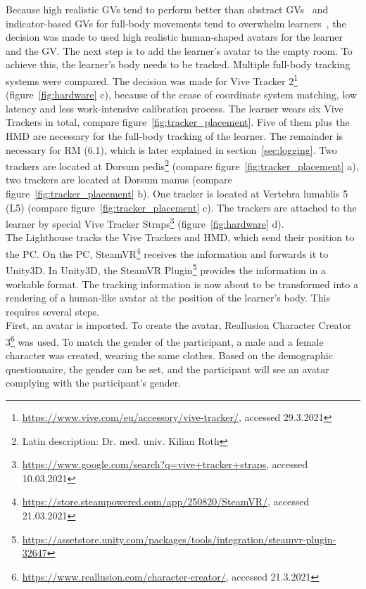 Because high realistic GVs tend to perform better than abstract GVs~\cite{weber} and indicator-based GVs for full-body movements tend to overwhelm learners~\cite{lightguide}, the decision was made to used high realistic human-shaped avatars for the learner and the GV. The next step is to add the learner's avatar to the empty room. To achieve this, the learner's body needs to be tracked. Multiple full-body tracking systems were compared. The decision was made for Vive Tracker 2\footnote{\href{https://www.vive.com/eu/accessory/vive-tracker/}{https://www.vive.com/eu/accessory/vive-tracker/}, accessed 29.3.2021} (figure~\ref{fig:hardware} c), because of the cease of coordinate system matching, low latency and less work-intensive calibration process. The learner wears six Vive Trackers in total, compare figure~\ref{fig:tracker_placement}. Five of them plus the HMD are necessary for the full-body tracking of the learner. The remainder is necessary for RM (6.1), which is later explained in section~\ref{sec:logging}. Two trackers are located at Dorsum pedis\footnote{\label{fn:latin}Latin description: Dr. med. univ. Kilian Roth} (compare figure~\ref{fig:tracker_placement} a), two trackers are located at Dorsum manus (compare figure~\ref{fig:tracker_placement} b). One  tracker is located at Vertebra lumablis 5 (L5) (compare figure~\ref{fig:tracker_placement} c). The trackers are attached to the learner by special Vive Tracker Straps\footnote{\href{https://www.google.com/search?q=vive+tracker+straps}{https://www.google.com/search?q=vive+tracker+straps}, accessed 10.03.2021} (figure~\ref{fig:hardware} d).\\
The Lighthouse tracks the Vive Trackers and HMD, which send their position to the PC. On the PC, SteamVR\footnote{\href{https://store.steampowered.com/app/250820/SteamVR/}{https://store.steampowered.com/app/250820/SteamVR/}, accessed 21.03.2021} receives the information and forwards it to Unity3D. In Unity3D, the SteamVR Plugin\footnote{\href{https://assetstore.unity.com/packages/tools/integration/steamvr-plugin-32647}{https://assetstore.unity.com/packages/tools/integration/steamvr-plugin-32647}} provides the information in a workable format. The tracking information is now about to be transformed into a rendering of a human-like avatar at the position of the learner's body. This requires several steps.\\First, an avatar is imported. To create the avatar, Reallusion Character Creator 3\footnote{\href{https://www.reallusion.com/character-creator/}{https://www.reallusion.com/character-creator/}, accessed 21.3.2021} was used. To match the gender of the participant, a male and a female character was created, wearing the same clothes. Based on the demographic questionnaire, the gender can be set, and the participant will see an avatar complying with the participant's gender.\\
